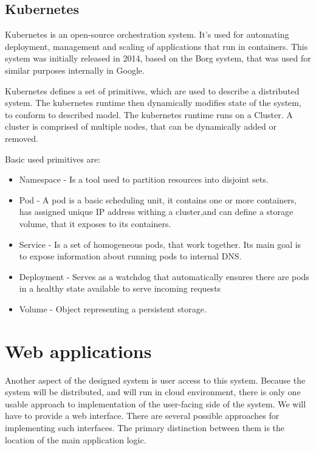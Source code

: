 \subsection{Kubernetes}

Kubernetes\cite{web:k8s} is an open-source orchestration system. It's used for automating
deployment, management and scaling of applications that run in containers. This system was initially released in 2014,
based on the Borg\cite{borg} system, that was used for similar purposes internally in Google.

Kubernetes defines a set of primitives, which are used to describe a distributed system. The kubernetes
runtime then dynamically modifies state of the system, to conform to described model. The kubernetes runtime
runs on a Cluster. A cluster is comprised of multiple nodes, that can be dynamically added or removed.

Basic used primitives are:
\begin{itemize}
    \item Namespace - Is a tool used to partition resources into disjoint sets.
    \item Pod - A pod is a basic scheduling unit, it contains one or more containers, has assigned unique IP address
    withing a cluster,and can define a storage volume, that it exposes to its containers.
    \item Service - Is a set of homogeneous pods, that work together. Its main goal is to expose information about running
    pods to internal DNS.
    \item Deployment - Serves as a watchdog that automatically ensures there are pods in a healthy state available to
    serve incoming requests
    \item Volume - Object representing a persistent storage.
\end{itemize}


\section{Web applications}
Another aspect of the designed system is user access to this system. Because the system will be distributed, and will run
in cloud environment, there is only one usable approach to implementation of the user-facing side of the system.
We will have to provide a web interface. There are several possible approaches for implementing such interfaces. The primary
distinction between them is the location of the main application logic.

